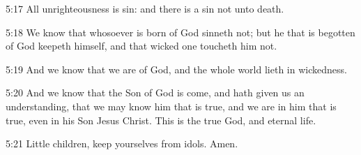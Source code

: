 5:17 All unrighteousness is sin: and there is a sin not unto death.

5:18 We know that whosoever is born of God sinneth not; but he that is
begotten of God keepeth himself, and that wicked one toucheth him not.

5:19 And we know that we are of God, and the whole world lieth in
wickedness.

5:20 And we know that the Son of God is come, and hath given us an
understanding, that we may know him that is true, and we are in him
that is true, even in his Son Jesus Christ. This is the true God, and
eternal life.

5:21 Little children, keep yourselves from idols. Amen.

